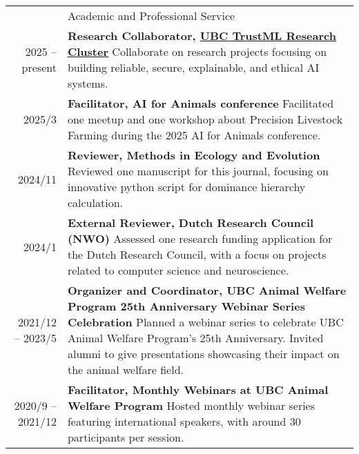 \documentclass[letterpaper, 11pt]{article}
\newcommand{\headingfont}{\Large\color{OliveGreen}}
\newenvironment{SectionTable}[1]{
	\renewcommand*{\arraystretch}{1.7}
	\setlength{\tabcolsep}{10pt}
	\begin{longtable}{Rp{5.2in}} & #1 \\}
{\end{longtable}\vspace{-.3cm}}
\begin{document}
\begin{SectionTable}{\headingfont Academic and Professional Service}
2025 -- present &
\textbf{Research Collaborator, \href{https://trustml.ubc.ca/profiles/sky-sheng}{UBC TrustML Research Cluster}} \newline
Collaborate on research projects focusing on building reliable, secure, explainable, and ethical AI systems. \\
2025/3 &
\textbf{Facilitator, AI for Animals conference} \newline
Facilitated one meetup and one workshop about Precision Livestock Farming during the 2025 AI for Animals conference. \\
2024/11 &
\textbf{Reviewer, Methods in Ecology and Evolution} \newline
Reviewed one manuscript for this journal, focusing on innovative python script for dominance hierarchy calculation. \\
2024/1 &
\textbf{External Reviewer, Dutch Research Council (NWO)} \newline
Assessed one research funding application for the Dutch Research Council, with a focus on projects related to computer science and neuroscience. \\
2021/12 -- 2023/5 &
\textbf{Organizer and Coordinator, UBC Animal Welfare Program 25th Anniversary Webinar Series Celebration} \newline
Planned a webinar series to celebrate UBC Animal Welfare Program's 25th Anniversary. Invited alumni to give presentations showcasing their impact on the animal welfare field. \\
2020/9 -- 2021/12 &
\textbf{Facilitator, Monthly Webinars at UBC Animal Welfare Program} \newline
Hosted monthly webinar series featuring international speakers, with around 30 participants per session. \\
\end{SectionTable}
\end{document}
